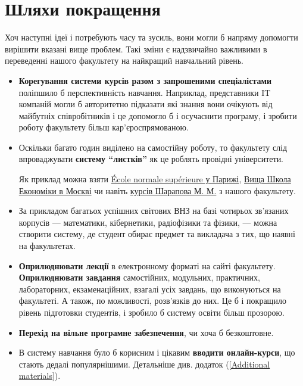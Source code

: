 \documentclass[14pt, a4paper]{extarticle}  %
\begin{document}
\newpage
\section{Шляхи покращення}

Хоч наступні ідеї і потребують часу та зусиль, вони могли б напряму допомогти  вирішити вказані вище проблем. Такі зміни є надзвичайно важливими в переведенні нашого факультету на найкращий навчальний рівень.    

\begin{itemize}
    \item  \textbf{Корегування системи курсів разом з  запрошеними спеціалістами} поліпшило б перспективність навчання. Наприклад, представники IT компаній могли б авторитетно підказати які знання вони очікують від майбутніх співробітників і це допомогло б і осучаснити програму, і зробити роботу факультету більш кар'єроспрямованою.
    
    \item Оскільки багато годин виділено на самостійну роботу, то факультету слід впроваджувати \textbf{систему ``листків''} як це роблять провідні університети. 
    
    Як приклад можна взяти \href{https://www.math.ens.fr/enseignement/fiche_cours.html?cours=201}{École normale supérieure у Парижі}, \href{https://math.hse.ru/bac3/4-pma-13}{Вища Школа Економіки в Москві} чи навіть \href{http://teorver.pp.ua/ukr/ukr.php?templ=tv1}{курсів Шарапова М. М.} з нашого факультету.  
    
    \item За прикладом багатьох успішних світових ВНЗ на базі чотирьох зв'язаних корпусів --- математики, кібернетики, радіофізики та фізики, --- можна створити систему, де студент обирає предмет та викладача з тих, що наявні на факультетах.%
    
    \item  \textbf{Оприлюднювати лекції} в електронному форматі на сайті факультету.
     \textbf{Оприлюднювати завдання} самостійних, модульних, практичних, лабораторних, екзаменаційних, взагалі усіх завдань, що виконуються на факультеті. А також, по можливості, розв'язків до них. Це б і покращило рівень підготовки студентів, і зробило б систему освіти більш прозорою. 
    
    \item \textbf{Перехід на вільне програмне забезпечення}, чи хоча б безкоштовне.
    
    \item В систему навчання було б корисним і цікавим \textbf{вводити онлайн-курси}, що стають дедалі популярнішими. Детальніше див. додаток (\ref{Additional materials}).
\end{itemize}
\end{document}
